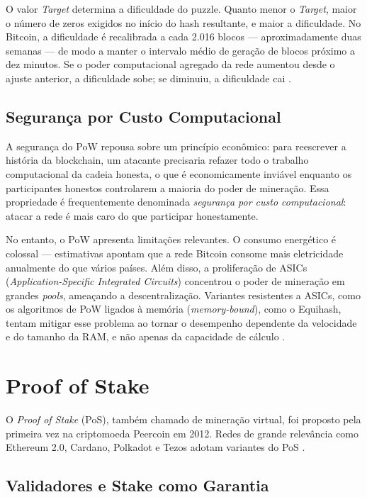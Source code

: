 \documentclass[12pt,a4paper]{report}
\begin{document}
O valor \textit{Target} determina a dificuldade do puzzle. Quanto menor o \textit{Target}, maior o número de zeros exigidos no início do hash resultante, e maior a dificuldade. No Bitcoin, a dificuldade é recalibrada a cada 2.016 blocos --- aproximadamente duas semanas --- de modo a manter o intervalo médio de geração de blocos próximo a dez minutos. Se o poder computacional agregado da rede aumentou desde o ajuste anterior, a dificuldade sobe; se diminuiu, a dificuldade cai \cite{Bashir2023}.

\subsection{Segurança por Custo Computacional}

A segurança do PoW repousa sobre um princípio econômico: para reescrever a história da blockchain, um atacante precisaria refazer todo o trabalho computacional da cadeia honesta, o que é economicamente inviável enquanto os participantes honestos controlarem a maioria do poder de mineração. Essa propriedade é frequentemente denominada \textit{segurança por custo computacional}: atacar a rede é mais caro do que participar honestamente.

No entanto, o PoW apresenta limitações relevantes. O consumo energético é colossal --- estimativas apontam que a rede Bitcoin consome mais eletricidade anualmente do que vários países. Além disso, a proliferação de ASICs (\textit{Application-Specific Integrated Circuits}) concentrou o poder de mineração em grandes \textit{pools}, ameaçando a descentralização. Variantes resistentes a ASICs, como os algoritmos de PoW ligados à memória (\textit{memory-bound}), como o Equihash, tentam mitigar esse problema ao tornar o desempenho dependente da velocidade e do tamanho da RAM, e não apenas da capacidade de cálculo \cite{Bashir2023}.

\section{Proof of Stake}

O \textit{Proof of Stake} (PoS), também chamado de mineração virtual, foi proposto pela primeira vez na criptomoeda Peercoin em 2012. Redes de grande relevância como Ethereum 2.0, Cardano, Polkadot e Tezos adotam variantes do PoS \cite{Bashir2023}.

\subsection{Validadores e Stake como Garantia}
\end{document}
